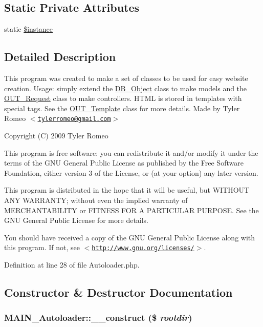 \subsection*{Static Private Attributes}
\begin{DoxyCompactItemize}
\item 
static \hyperlink{classMAIN__Autoloader_a00cdc353ce3e2665f86e87e3abb8bf0a}{\$instance}
\end{DoxyCompactItemize}


\subsection{Detailed Description}
This program was created to make a set of classes to be used for easy website creation. Usage: simply extend the \hyperlink{classDB__Object}{DB\_\-Object} class to make models and the \hyperlink{classOUT__Request}{OUT\_\-Request} class to make controllers. HTML is stored in templates with special tags. See the \hyperlink{classOUT__Template}{OUT\_\-Template} class for more details. Made by Tyler Romeo $<$\href{mailto:tylerromeo@gmail.com}{\tt tylerromeo@gmail.com}$>$

Copyright (C) 2009 Tyler Romeo

This program is free software: you can redistribute it and/or modify it under the terms of the GNU General Public License as published by the Free Software Foundation, either version 3 of the License, or (at your option) any later version.

This program is distributed in the hope that it will be useful, but WITHOUT ANY WARRANTY; without even the implied warranty of MERCHANTABILITY or FITNESS FOR A PARTICULAR PURPOSE. See the GNU General Public License for more details.

You should have received a copy of the GNU General Public License along with this program. If not, see $<$\href{http://www.gnu.org/licenses/}{\tt http://www.gnu.org/licenses/}$>$. 

Definition at line 28 of file Autoloader.php.

\subsection{Constructor \& Destructor Documentation}
\hypertarget{classMAIN__Autoloader_a201bd218d1efdce335722cd1e60ef599}{
\subsubsection[{\_\-\_\-construct}]{\setlength{\rightskip}{0pt plus 5cm}MAIN\_\-Autoloader::\_\-\_\-construct (\$ {\em rootdir})}}
\label{dd/d71/classMAIN__Autoloader_a201bd218d1efdce335722cd1e60ef599}


